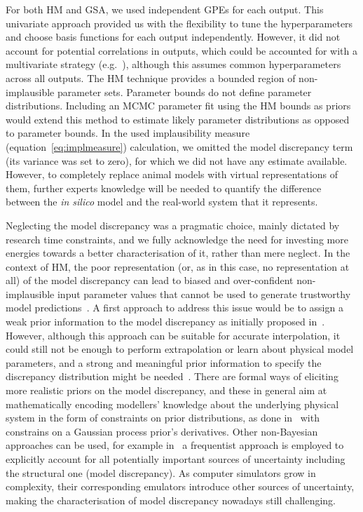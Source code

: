 \vspace{0.2cm}
For both HM and GSA, we used independent GPEs for each output. This univariate approach provided us with the flexibility to tune the hyperparameters and choose basis functions for each output independently. However, it did not account for potential correlations in outputs, which could be accounted for with a multivariate strategy (e.g.~\cite{Conti:2009}), although this assumes common hyperparameters across all outputs. The HM technique provides a bounded region of non-implausible parameter sets. Parameter bounds do not define parameter distributions. Including an MCMC parameter fit using the HM bounds as priors would extend this method to estimate likely parameter distributions as opposed to parameter bounds. In the used implausibility measure (equation~\eqref{eq:implmeasure}) calculation, we omitted the model discrepancy term (its variance was set to zero), for which we did not have any estimate available. However, to completely replace animal models with virtual representations of them, further experts knowledge will be needed to quantify the difference between the \textit{in silico} model and the real-world system that it represents.

\vspace{0.2cm}
Neglecting the model discrepancy was a pragmatic choice, mainly dictated by research time constraints, and we fully acknowledge the need for investing more energies towards a better characterisation of it, rather than mere neglect. In the context of HM, the poor representation (or, as in this case, no representation at all) of the model discrepancy can lead to biased and over-confident non-implausible input parameter values that cannot be used to generate trustworthy model predictions~\cite{Volodina:2021}. A first approach to address this issue would be to assign a weak prior information to the model discrepancy as initially proposed in~\cite{Kennedy:2001}. However, although this approach can be suitable for accurate interpolation, it could still not be enough to perform extrapolation or learn about physical model parameters, and a strong and meaningful prior information to specify the discrepancy distribution might be needed~\cite{Brynjarsdottir:2014}. There are formal ways of eliciting more realistic priors on the model discrepancy, and these in general aim at mathematically encoding modellers' knowledge about the underlying physical system in the form of constraints on prior distributions, as done in~\cite{Brynjarsdottir:2014} with constrains on a Gaussian process prior's derivatives. Other non-Bayesian approaches can be used, for example in~\cite{Wong:2017} a frequentist approach is employed to explicitly account for all potentially important sources of uncertainty including the structural one (model discrepancy). As computer simulators grow in complexity, their corresponding emulators introduce other sources of uncertainty, making the characterisation of model discrepancy nowadays still challenging.


